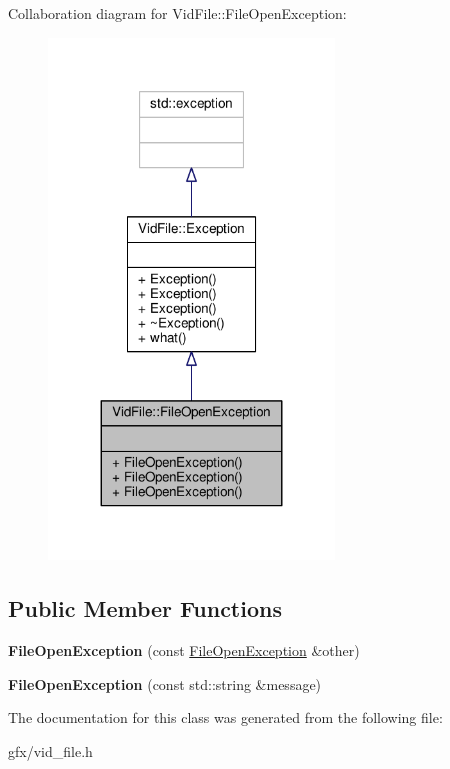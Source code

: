 Collaboration diagram for Vid\+File\+:\+:File\+Open\+Exception\+:
\nopagebreak
\begin{figure}[H]
\begin{center}
\leavevmode
\includegraphics[width=215pt]{d5/d6a/classVidFile_1_1FileOpenException__coll__graph}
\end{center}
\end{figure}
\subsection*{Public Member Functions}
\begin{DoxyCompactItemize}
\item 
{\bfseries File\+Open\+Exception} (const \hyperlink{classVidFile_1_1FileOpenException}{File\+Open\+Exception} \&other)\hypertarget{classVidFile_1_1FileOpenException_aa0b01bd9651aa6465017a05d8f6aa295}{}\label{classVidFile_1_1FileOpenException_aa0b01bd9651aa6465017a05d8f6aa295}

\item 
{\bfseries File\+Open\+Exception} (const std\+::string \&message)\hypertarget{classVidFile_1_1FileOpenException_a4cc05a47c11257b10bc7018f2dc00f44}{}\label{classVidFile_1_1FileOpenException_a4cc05a47c11257b10bc7018f2dc00f44}

\end{DoxyCompactItemize}


The documentation for this class was generated from the following file\+:\begin{DoxyCompactItemize}
\item 
gfx/vid\+\_\+file.\+h\end{DoxyCompactItemize}
